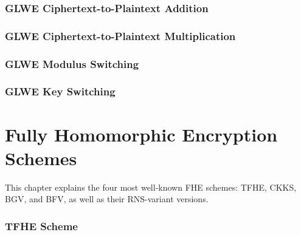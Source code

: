\documentclass[11pt]{article}
\begin{document}
\section{GLWE Ciphertext-to-Plaintext Addition}
\label{sec:glwe-add-plain}


\clearpage

\section{GLWE Ciphertext-to-Plaintext Multiplication}
\label{sec:glwe-mult-plain}


\clearpage

\section{GLWE Modulus Switching}
\label{sec:modulus-switching}


\clearpage


\section{GLWE Key Switching}
\label{sec:glwe-key-switching}




\clearpage


%


\part{Fully Homomorphic Encryption Schemes}
\label{part:fhe-schemes}

\renewcommand{\thesection}{D-\arabic{section}}
\setcounter{section}{0}

This chapter explains the four most well-known FHE schemes: TFHE, CKKS, BGV, and BFV, as well as their RNS-variant versions. 

\newpage

\section{TFHE Scheme}
\label{sec:tfhe}

\end{document}
